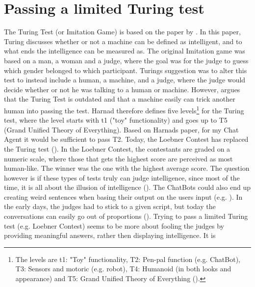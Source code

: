 \section{Passing a limited Turing test}
\label{chapter3:turing_test}
The Turing Test (or Imitation Game) is based on the paper by \citet{Turing1998}. In this paper, Turing discusses whether or not a machine can be defined as intelligent, and to 
what ends the intelligence can be measured as. The original Imitation game was based on a man, a woman and a judge, where the goal was for the judge to guess which gender belonged 
to which participant. Turings suggestion was to alter this test to instead include a human, a machine, and a judge, where the judge would decide whether or not he was talking to a 
human or machine. However, \citet{Harnad2000} argues that the Turing Test is outdated and that a machine easily can trick another human into passing the test. Harnad therefore 
defines five levels\footnote{The levels are t1: "Toy" functionality, T2: Pen-pal function (e.g. ChatBot), T3: Sensors and motoric (e.g. robot), T4: Humanoid (in both looks and 
	appearance) and T5: Grand Unified Theory of Everything (\citet{Harnad2000}).} for the Turing test, where the level starts with t1 ("toy" functionality) and goes up to T5 
(Grand Unified Theory of Everything). Based on Harnads paper, for my Chat Agent it would be sufficient to pass T2.
\vspace{0.5em}\newline
Today, the Loebner Contest has replaced the Turing test (\citet{Shieber1994,Zdenek2001}). In the Loebner Contest, the contestants are graded on a numeric scale, where those that 
gets the highest score are perceived as most human-like. The winner was the one with the highest average score. The question however is if these types of tests truly can judge 
intelligence, since most of the time, it is all about the illusion of intelligence (\citet{Livingstone2006, Shieber1994}). The ChatBots could also end up creating weird 
sentences when basing their output on the users input (e.g. \citet[p.~6]{Shieber1994}). In the early days, the judges had to stick to a given script, but today the conversations 
can easily go out of proportions (\citet[p.~13]{Zdenek2001}).
\vspace{0.5em}\newline
Trying to pass a limited Turing test (e.g. Loebner Contest) seems to be more about fooling the judges by providing meaningful answers, rather then displaying intelligence. It is 
